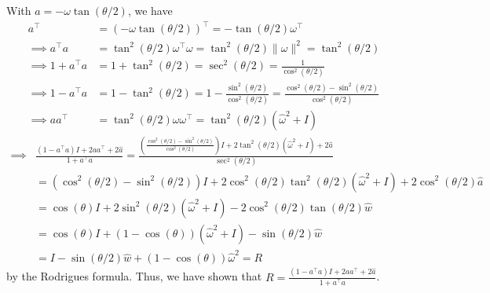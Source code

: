 With \( a = -\omega \tan(\theta / 2) \), we have
\begin{align*}
    a^\top
     & =
    {(-\omega \tan(\theta / 2))}^\top
    =
    -\tan(\theta / 2) \omega^\top
    \\
    \implies
    a^{\top} a
     & =
    \tan^{2}(\theta / 2) \omega^\top \omega
    =
    \tan^{2}(\theta / 2) \| \omega \|^{2}
    =
    \tan^{2}(\theta / 2)
    \\
    \implies
    1 + a^{\top} a
     & =
    1 + \tan^{2}(\theta / 2)
    =
    \sec^{2}(\theta / 2)
    =
    \frac{1}{\cos^{2}(\theta / 2)}
    \\
    \implies
    1 - a^{\top} a
     & =
    1 - \tan^{2}(\theta / 2)
    =
    1 - \frac{\sin^{2}(\theta / 2)}{\cos^{2}(\theta / 2)}
    =
    \frac{\cos^{2}(\theta / 2) - \sin^{2}(\theta / 2)}{\cos^{2}(\theta / 2)}
    \\
    \implies
    a a^{\top}
     & =
    \tan^{2}(\theta / 2) \omega \omega^{\top}
    =
    \tan^{2}(\theta / 2) (\widehat{\omega}^2 + I)
\end{align*}
\begin{align*}
    \implies
     &
    \frac{(1 - a^{\top} a) I + 2 a a^{\top} + 2 \widehat{a}}{1 + a^{\top} a}
    =
    \frac{\left( \frac{\cos^{2}(\theta / 2) - \sin^{2}(\theta / 2)}{\cos^{2}(\theta / 2)} \right) I + 2 \tan^{2}(\theta / 2) (\widehat{\omega}^2 + I) + 2 \widehat{a}}{\sec^{2}(\theta / 2)}
    \\ & =
    \left( \cos^{2}(\theta / 2) - \sin^{2}(\theta / 2) \right) I + 2 \cos^{2}(\theta / 2) \tan^{2}(\theta / 2) (\widehat{\omega}^2 + I) + 2 \cos^{2}(\theta / 2) \widehat{a}
    \\ & =
    \cos(\theta) I + 2 \sin^{2}(\theta / 2) (\widehat{\omega}^2 + I) - 2 \cos^{2}(\theta / 2) \tan(\theta / 2) \widehat{w}
    \\ & =
    \cos(\theta) I + (1 - \cos(\theta)) (\widehat{\omega}^2 + I) - \sin(\theta / 2) \widehat{w}
    \\ & =
    I - \sin(\theta / 2) \widehat{w} + (1 - \cos(\theta)) \widehat{\omega}^2
    =
    R
\end{align*}
by the Rodrigues formula.
Thus, we have shown that \( \boxed{R = \frac{(1 - a^{\top} a) I + 2 a a^{\top} + 2 \widehat{a}}{1 + a^{\top} a}} \).

